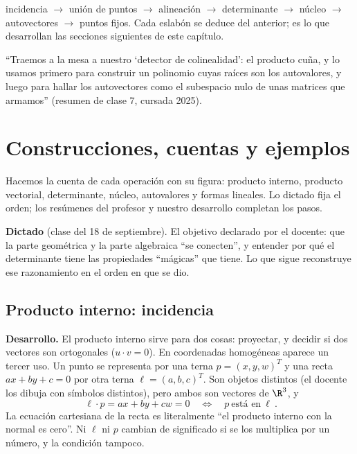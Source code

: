 \begin{idea}[La cadena]
incidencia \(\to\) unión de puntos \(\to\) alineación \(\to\) determinante \(\to\)
núcleo \(\to\) autovectores \(\to\) puntos fijos. Cada eslabón se deduce del anterior;
es lo que desarrollan las secciones siguientes de este capítulo.
\end{idea}

\begin{idea}
``Traemos a la mesa a nuestro `detector de colinealidad': el producto cuña, y lo usamos
primero para construir un polinomio cuyas raíces son los autovalores, y luego para hallar
los autovectores como el subespacio nulo de unas matrices que armamos'' (resumen de clase 7, cursada 2025).
\end{idea}

\section{Construcciones, cuentas y ejemplos}

Hacemos la cuenta de cada operación con su figura: producto interno, producto vectorial, determinante, núcleo, autovalores y formas lineales. Lo dictado fija el orden; los resúmenes del profesor y nuestro desarrollo completan los pasos.

\textbf{Dictado} (clase del 18 de septiembre). El objetivo declarado por el docente: que la
parte geométrica y la parte algebraica ``se conecten'', y entender por qué el determinante
tiene las propiedades ``mágicas'' que tiene. Lo que sigue reconstruye ese razonamiento en el
orden en que se dio.

\subsection{Producto interno: incidencia}\label{sec:interno}

{\small\vspace{1mm}\par}


\textbf{Desarrollo.} El producto interno sirve para dos cosas: proyectar, y decidir si dos
vectores son ortogonales (\(u\cdot v=0\)). En coordenadas homogéneas aparece un tercer uso.
Un punto se representa por una terna \(p=(x,y,w)^T\) y una recta \(ax+by+c=0\) por otra
terna \(\ell=(a,b,c)^T\). Son objetos distintos (el docente los dibuja con símbolos
distintos), pero ambos son vectores de \(\R^3\), y
\[
  \boxed{\ \ell\cdot p=ax+by+cw=0\quad\Longleftrightarrow\quad p\ \text{está en}\ \ell\ }.
\]
La ecuación cartesiana de la recta es literalmente ``el producto interno con la normal es
cero''. Ni \(\ell\) ni \(p\) cambian de significado si se los multiplica por un número, y la
condición tampoco.

